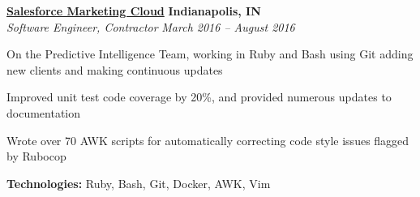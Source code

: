 %
    \headerrow
        {\textbf{\href{https://www.marketingcloud.com/}{Salesforce Marketing Cloud}}}
        {\textbf{Indianapolis, IN}}
    \\
    \headerrow
        {\emph{Software Engineer, Contractor}}
        {\emph{March 2016 -- August 2016}}
    \begin{itemize*}
        \item On the Predictive Intelligence Team, working in Ruby and Bash using Git adding new clients and making continuous updates
        \item Improved unit test code coverage by 20\%, and provided numerous updates to documentation
        \item Wrote over 70 AWK scripts for automatically correcting code style issues flagged by Rubocop
    \end{itemize*}

    \hspace{1.0em}
    \textbf{Technologies:} Ruby, Bash, Git, Docker, AWK, Vim
